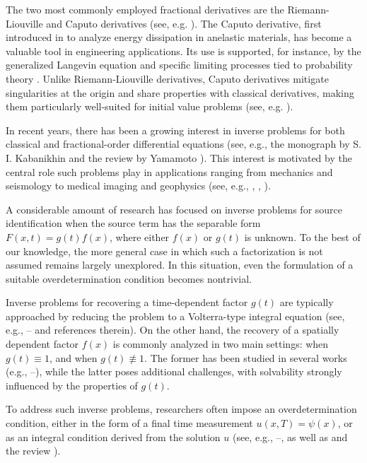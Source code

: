 \documentclass[12pt]{amsart}
\theoremstyle{definition}
\numberwithin{equation}{section}
\begin{document}
The two most commonly employed fractional derivatives are the Riemann-Liouville and Caputo derivatives (see, e.g. \cite{Kil}). The Caputo derivative, first introduced in \cite{Caputo} to analyze energy dissipation in anelastic materials, has become a valuable tool in engineering applications. Its use is supported, for instance, by the generalized Langevin equation \cite{13} and specific limiting processes tied to probability theory \cite{14, 15}. Unlike Riemann-Liouville derivatives, Caputo derivatives mitigate singularities at the origin and share properties with classical derivatives, making them particularly well-suited for initial value problems (see, e.g. \cite{Samko, PSK}).


In recent years, there has been a growing interest in inverse problems for both classical and fractional-order differential equations (see, e.g., the monograph by S. I. Kabanikhin \cite{Kaban} and the review by Yamamoto \cite{Yamamoto1}). This interest is motivated by the central role such problems play in applications ranging from mechanics and seismology to medical imaging and geophysics (see, e.g., \cite{Machado}, \cite{Kaban}, \cite{Yamamoto1}).

A considerable amount of research has focused on inverse problems for source identification when the source term has the separable form $F(x, t) = g(t) f(x)$, where either $f(x)$ or $g(t)$ is unknown. To the best of our knowledge, the more general case in which such a factorization is not assumed remains largely unexplored. In this situation, even the formulation of a suitable overdetermination condition becomes nontrivial.

Inverse problems for recovering a time-dependent factor $g(t)$ are typically approached by reducing the problem to a Volterra-type integral equation (see, e.g., \cite{ASh1}–\cite{ASh2} and references therein). On the other hand, the recovery of a spatially dependent factor $f(x)$ is commonly analyzed in two main settings: when $g(t) \equiv 1$, and when $g(t) \not\equiv 1$. The former has been studied in several works (e.g., \cite{KirM}–\cite{AMux1}), while the latter poses additional challenges, with solvability strongly influenced by the properties of $g(t)$.

To address such inverse problems, researchers often impose an overdetermination condition, either in the form of a final time measurement $u(x, T) = \psi(x)$, or as an integral condition derived from the solution $u$ (see, e.g., \cite{ASh3}–\cite{VanBockstal}, as well as \cite{Kaban} and the review \cite{Yamamoto1}).
\end{document}
